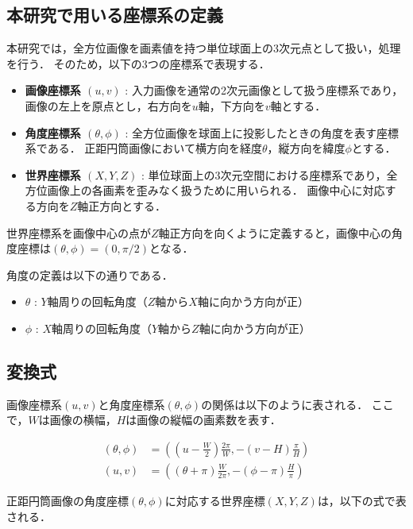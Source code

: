 \documentclass{ltjsarticle}          %
\begin{document}
\subsection{本研究で用いる座標系の定義}
本研究では，全方位画像を画素値を持つ単位球面上の3次元点として扱い\cite{bib_1}，処理を行う．
そのため，以下の3つの座標系で表現する．
\begin{itemize}
  \item \textbf{画像座標系 $(u, v)$} :
  入力画像を通常の2次元画像として扱う座標系であり，
  画像の左上を原点とし，右方向を$u$軸，下方向を$v$軸とする．

  \item \textbf{角度座標系 $(\theta, \phi)$} :
  全方位画像を球面上に投影したときの角度を表す座標系である．
  正距円筒画像において横方向を経度$\theta$，縦方向を緯度$\phi$とする．

  \item \textbf{世界座標系 $(X, Y, Z)$} :
  単位球面上の3次元空間における座標系であり，全方位画像上の各画素を歪みなく扱うために用いられる．
  画像中心に対応する方向を$Z$軸正方向とする．
\end{itemize}

世界座標系を画像中心の点が$Z$軸正方向を向くように定義すると，画像中心の角度座標は$(\theta, \phi) = (0, \pi/2)$となる．

角度の定義は以下の通りである．
\begin{itemize}
  \item $\theta$  :  $Y$軸周りの回転角度（$Z$軸から$X$軸に向かう方向が正）
  \item $\phi$  :  $X$軸周りの回転角度（$Y$軸から$Z$軸に向かう方向が正）
\end{itemize}

\subsection{変換式}
画像座標系$(u,v)$と角度座標系$(\theta, \phi)$の関係は以下のように表される．
ここで，$W$は画像の横幅，$H$は画像の縦幅の画素数を表す．

\begin{align}
  (\theta, \phi) &= \left( \left(u - \frac{W}{2}\right) \frac{2\pi}{W}, -\left(v - H\right) \frac{\pi}{H} \right)
  \label{eq:image_to_angle} \\
  (u, v) &= \left( \left(\theta + \pi\right) \frac{W}{2\pi}, -\left(\phi - \pi\right) \frac{H}{\pi} \right)
  \label{eq:angle_to_image}
\end{align}

正距円筒画像の角度座標$(\theta, \phi)$に対応する世界座標$(X, Y, Z)$は，以下の式で表される．
\end{document}
